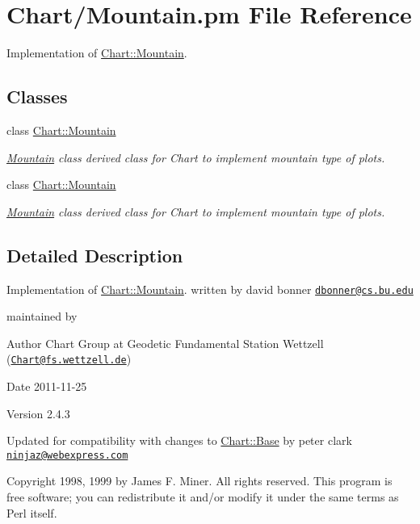 \hypertarget{Mountain_8pm}{
\section{Chart/Mountain.pm File Reference}
\label{Mountain_8pm}
}


Implementation of \hyperlink{classChart_1_1Mountain}{Chart::Mountain}.  


\subsection*{Classes}
\begin{DoxyCompactItemize}
\item 
class \hyperlink{classChart_1_1Mountain}{Chart::Mountain}
\begin{DoxyCompactList}\small\item\em \hyperlink{classChart_1_1Mountain}{Mountain} class derived class for Chart to implement mountain type of plots. \item\end{DoxyCompactList}\item 
class \hyperlink{classChart_1_1Mountain}{Chart::Mountain}
\begin{DoxyCompactList}\small\item\em \hyperlink{classChart_1_1Mountain}{Mountain} class derived class for Chart to implement mountain type of plots. \item\end{DoxyCompactList}\end{DoxyCompactItemize}


\subsection{Detailed Description}
Implementation of \hyperlink{classChart_1_1Mountain}{Chart::Mountain}. written by david bonner \href{mailto:dbonner@cs.bu.edu}{\tt dbonner@cs.bu.edu}

maintained by \begin{DoxyAuthor}{Author}
Chart Group at Geodetic Fundamental Station Wettzell (\href{mailto:Chart@fs.wettzell.de}{\tt Chart@fs.wettzell.de}) 
\end{DoxyAuthor}
\begin{DoxyDate}{Date}
2011-\/11-\/25 
\end{DoxyDate}
\begin{DoxyVersion}{Version}
2.4.3
\end{DoxyVersion}
Updated for compatibility with changes to \hyperlink{classChart_1_1Base}{Chart::Base} by peter clark \href{mailto:ninjaz@webexpress.com}{\tt ninjaz@webexpress.com}

Copyright 1998, 1999 by James F. Miner. All rights reserved. This program is free software; you can redistribute it and/or modify it under the same terms as Perl itself. 